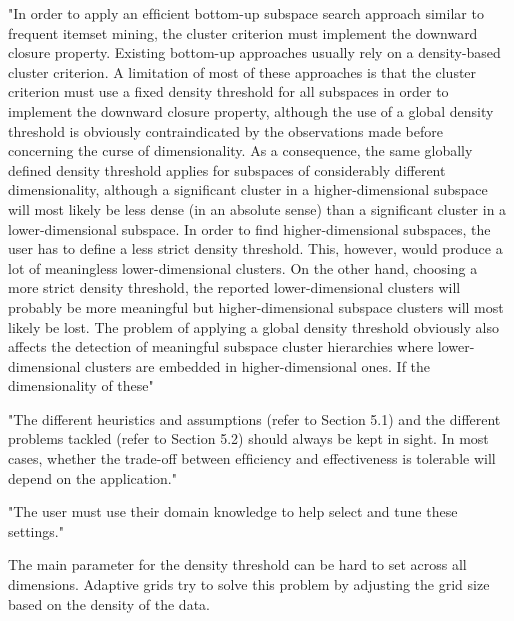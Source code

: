 "In order to apply an efﬁcient bottom-up subspace search approach similar to frequent itemset mining, the cluster criterion must implement the downward closure property. Existing bottom-up approaches usually rely on a density-based cluster criterion. A limitation of most of these approaches is that the cluster criterion must use a ﬁxed density threshold for all subspaces in order to implement the downward closure property, although the use of a global density threshold is obviously contraindicated by the observations made before concerning the curse of dimensionality. As a consequence, the same globally deﬁned density threshold applies for subspaces of considerably different dimensionality, although a signiﬁcant cluster in a higher-dimensional subspace will most likely be less dense (in an absolute sense) than a signiﬁcant cluster in a lower-dimensional subspace. In order to ﬁnd higher-dimensional subspaces, the user has to deﬁne a 
less strict density threshold. This, however, would produce a lot of meaningless lower-dimensional clusters. On the other hand, choosing a more strict density threshold, the reported lower-dimensional clusters will probably be more meaningful but higher-dimensional subspace clusters will most likely be lost. The 
problem of applying a global density threshold obviously also affects the detection of meaningful subspace cluster hierarchies where lower-dimensional clusters are embedded in higher-dimensional ones. If the dimensionality of these" \cite[p.1:48]{kriegel-2009}

"The different heuristics and assumptions (refer to Section 5.1) and the different problems tackled (refer to Section 5.2) should always be kept in sight. In most cases, whether the trade-off between efﬁciency and effectiveness is tolerable will depend on the application." \cite[p.1:50]{kriegel-2009}

"The user must use their domain knowledge to help select and tune these settings." \cite{parsons-2-2004}

The main parameter for the density threshold can be hard to set across all dimensions. Adaptive grids try to solve this problem by adjusting the grid size based on the density of the data.